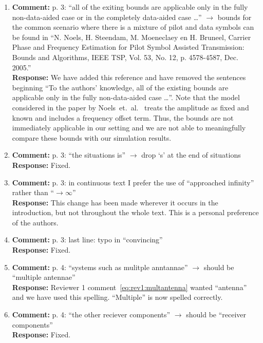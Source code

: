 \documentclass{article}
\begin{document}
\begin{enumerate}
\item \textbf{Comment:} p. 3: ``all of the exiting bounds are applicable only in the fully non-data-aided case or in the completely data-aided case \dots'' $\to$ bounds for the common scenario where there is a mixture of pilot and data symbols can be found in ``N. Noels, H. Steendam, M. Moeneclaey en H. Bruneel, Carrier Phase and Frequency Estimation for Pilot Symbol Assisted Transmission: Bounds and Algorithms, IEEE TSP, Vol. 53, No. 12, p. 4578-4587, Dec. 2005.'' \\
\textbf{Response:} We have added this reference and have removed the sentences beginning ``To the authors' knowledge, all of the existing bounds are applicable only in the fully non-data-aided case \dots''. Note that the model considered in the paper by Noels~et.~al.~\cite{Noels_crbs_with_pilots_2005} treats the amplitude as fixed and known and includes a frequency offset term.  Thus, the bounds are not immediately applicable in our setting and we are not able to meaningfully compare these bounds with our simulation results.  %

\item \textbf{Comment:} p. 3: ``the situations is'' $\to$ drop `s' at the end of situations \\
\textbf{Response:} Fixed.

\item \textbf{Comment:} p. 3: in continuous text I prefer the use of ``approached infinity'' rather than ``$\to \infty$'' \\
\textbf{Response:} This change has been made wherever it occurs in the introduction, but not throughout the whole text. This is a personal preference of the authors.

\item \textbf{Comment:} p. 3: last line: typo in ``convincing'' \\
\textbf{Response:} Fixed.

\item \textbf{Comment:} p. 4: ``systems such as mulitple anntannae'' $\to$ should be ``multiple antennae'' \\
\textbf{Response:} Reviewer 1 comment~\eqref{eq:rev1:multantenna} wanted ``antenna'' and we have used this spelling. ``Multiple'' is now spelled correctly.

\item \textbf{Comment:} p. 4: ``the other reciever components'' $\to$ should be ``receiver components'' \\
\textbf{Response:} Fixed.


\end{enumerate}
\end{document}

